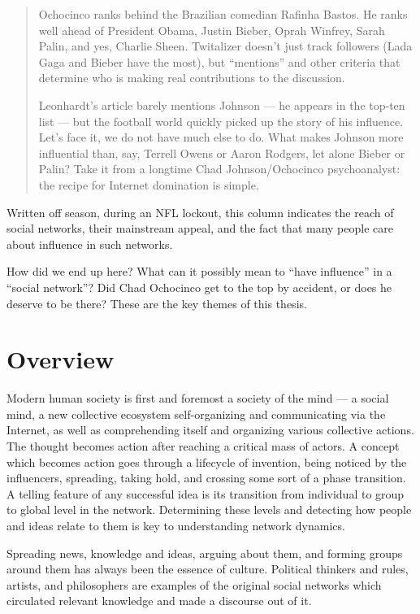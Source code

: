 \documentclass[10pt,oneside]{memoir}
\begin{document}
\begin{Spacing}{2}
\begin{quote}
Ochocinco ranks behind the Brazilian comedian Rafinha Bastos. He ranks well ahead of President Obama, Justin Bieber, Oprah Winfrey, Sarah Palin, and yes, Charlie Sheen. Twitalizer doesn't just track followers (Lada Gaga and Bieber have the most), but ``mentions'' and other criteria that determine who is making real contributions to the discussion.


Leonhardt's article barely mentions Johnson --- he appears in the top-ten list --- but the football world quickly picked up the story of his influence. Let's face it, we do not have much else to do. What makes Johnson more influential than, say, Terrell Owens or Aaron Rodgers, let alone Bieber or Palin? Take it from a longtime Chad Johnson/Ochocinco psychoanalyst: the recipe for Internet domination is simple.
\end{quote}


Written off season, during an NFL lockout, this column indicates the reach of social networks, their mainstream appeal, and the fact that many people care about influence in such networks.


How did we end up here?  What can it possibly mean to ``have influence'' in a ``social network''?  Did Chad Ochocinco get to the top by accident, or does he deserve to be there?  These are the key themes of this thesis.


\pagebreak \section{Overview}
\label{overview}

Modern human society is first and foremost a society of the mind --- a social mind, a new collective ecosystem self-organizing and communicating via the Internet, as well as comprehending itself and organizing various collective actions.  The thought becomes action after reaching a critical mass of actors.   A concept which becomes action goes through a lifecycle of invention, being noticed by the influencers, spreading, taking hold, and crossing some sort of a phase transition.  A telling feature of any successful idea is its transition from individual to group to global level in the network.  Determining these levels and detecting how people and ideas relate to them is key to understanding network dynamics.


Spreading news, knowledge and ideas, arguing about them, and forming groups around them has always been the essence of culture. Political thinkers and rules, artists, and philosophers are examples of the original social networks which circulated relevant knowledge and made a discourse out of it.



\end{Spacing}
\end{document}

